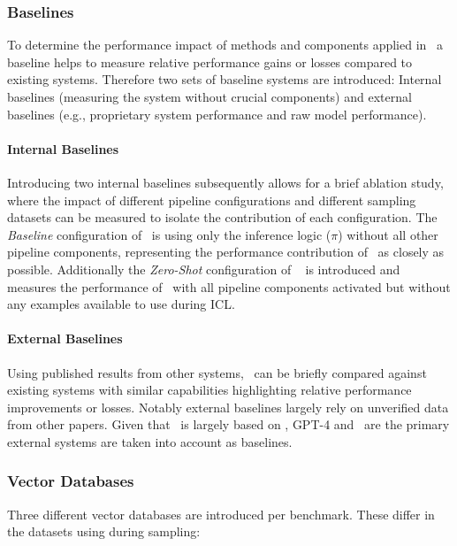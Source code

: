 \subsubsection{Baselines}

To determine the performance impact of methods and components
applied in \Natural~a baseline helps to measure relative performance
gains or losses compared to existing systems. Therefore two sets of baseline
systems are introduced: Internal baselines (measuring the system without
crucial components) and external baselines (e.g., proprietary system
performance and raw model performance).

\paragraph{Internal Baselines}

Introducing two internal baselines subsequently allows for a brief ablation
study, where the impact of different pipeline configurations and different
sampling datasets can be measured to isolate the contribution of each
configuration. The \textit{Baseline} configuration of \Natural~is using
only the inference logic ($\pi$) without all other pipeline components,
representing the performance contribution of \OmniSQL~as closely as
possible. Additionally the \textit{Zero-Shot} configuration of \Natural~
is introduced and measures the performance of \Natural~with all
pipeline components activated but without any examples available to use during ICL.

\paragraph{External Baselines}

Using published results from other systems, \Natural~can be briefly
compared against existing systems with similar capabilities highlighting
relative performance improvements or losses. Notably external baselines largely
rely on unverified data from other papers. Given that \Natural~is
largely based on \OmniSQL, GPT-4 and \OmniSQL~are the primary
external systems are taken into account as baselines.

\subsubsection{Vector Databases}

Three different vector databases are introduced per benchmark. These differ in
the datasets using during sampling:

